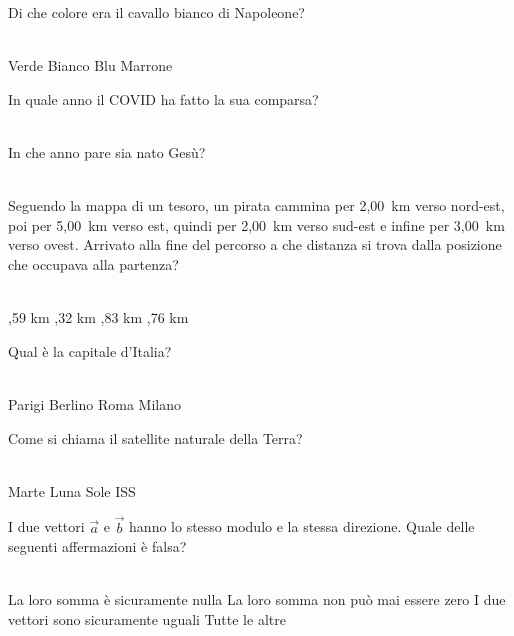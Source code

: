 \documentclass[a4paper,11pt]{exam}
\begin{document}
        \begin{center} 
        \end{center}
\begin{questions}

    
\question Di che colore era il cavallo bianco di Napoleone?\\\
\begin{oneparchoices}
  \choice Verde
  \choice Bianco
  \choice Blu 
  \choice Marrone
\end{oneparchoices}

    
\question In quale anno il COVID ha fatto la sua comparsa?\\\
\begin{oneparchoices}
  \choice 2019
\end{oneparchoices}

    
\question In che anno pare sia nato Gesù?\\\
\begin{oneparchoices}
  \choice 0
  19
  \choice 20
  \choice -80
\end{oneparchoices}

    
\question Seguendo la mappa di un tesoro, un pirata cammina per 2,00~km verso nord-est, poi per 5,00~km verso est, quindi per 2,00~km verso sud-est e infine per 3,00~km verso ovest. Arrivato alla fine del percorso a che distanza si trova dalla posizione che occupava alla partenza?\\\
\begin{oneparchoices}
  ,59 km
  \choice 6,32 km
  \choice 4,83 km
  \choice 4,76 km
\end{oneparchoices}

    
\question Qual è la capitale d’Italia?\\\
\begin{oneparchoices}
  \choice Parigi
  \choice Berlino
  \choice Roma
  \choice Milano
\end{oneparchoices}

    
\question Come si chiama il satellite naturale della Terra?\\\
\begin{oneparchoices}
  \choice Marte
  \choice Luna
  \choice Sole
  \choice ISS
\end{oneparchoices}

    
\question I due vettori $\vec{a}$ e $\vec{b}$ hanno lo stesso modulo e la stessa direzione. Quale delle seguenti affermazioni è falsa?\\\
\begin{oneparchoices}
  \choice La loro somma è sicuramente nulla
  \choice La loro somma non può mai essere zero
  \choice I due vettori sono sicuramente uguali
  \choice Tutte le altre
\end{oneparchoices}


\end{questions}
\end{document}
